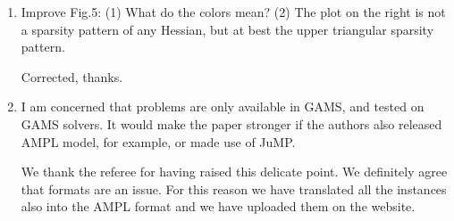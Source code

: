 \documentclass[11pt]{article}
\newcommand{\rep}[1]{{\textcolor{acblue}{#1}}}
\newcommand{\leo}[1]{{\color{red}#1}}
\newcommand{\fabio}[1]{{\color{cyan}#1}}
\begin{document}
{\begin{enumerate}
\rep{
We renamed ``hard" to ``problematic". However, as explained in \S 2.2.1 and 2.2.2, we refrain from reformulating the instance, and we do not tailor problems to specific solvers (moreover, not all QP solvers would resort to reduced Hessians). In the same vein, our analysis can only be based on the given instance structure.
 }


\item Improve Fig.5: (1) What do the colors mean? (2) The plot on the right is not a sparsity pattern
of any Hessian, but at best the upper triangular sparsity pattern.

\rep{Corrected, thanks.}


\item I am concerned that problems are only available in GAMS, and tested on GAMS solvers. It would make the paper stronger if the authors also released AMPL model, for example, or made use of
JuMP.

\rep{
We thank the referee for having raised this delicate point. We definitely agree that formats are an issue.
For this reason we have translated all the instances also into the AMPL format and we have uploaded them on the website.
}

\end{enumerate}

}
\end{document}
